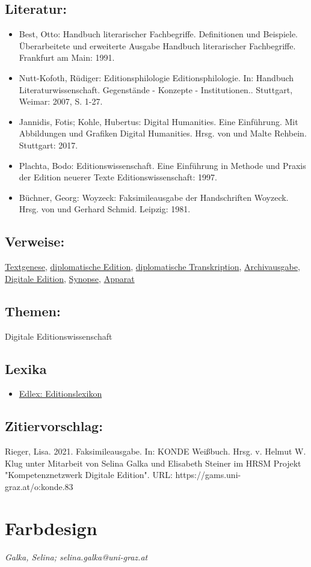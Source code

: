 \documentclass{article}
\begin{document}
        \subsection*{Literatur:}\begin{itemize}\item Best, Otto: Handbuch literarischer Fachbegriffe. Definitionen und
                              Beispiele. Überarbeitete und erweiterte Ausgabe Handbuch literarischer Fachbegriffe. Frankfurt am Main: 1991.\item Nutt-Kofoth, Rüdiger: Editionsphilologie Editionsphilologie. In: Handbuch Literaturwissenschaft. Gegenstände - Konzepte -
                              Institutionen.. Stuttgart, Weimar: 2007, S. 1-27.\item Jannidis, Fotis; Kohle, Hubertus: Digital Humanities. Eine Einführung. Mit Abbildungen und
                              Grafiken Digital Humanities. Hrsg. von  und Malte Rehbein. Stuttgart: 2017.\item Plachta, Bodo: Editionswissenschaft. Eine Einführung in Methode und
                              Praxis der Edition neuerer Texte Editionswissenschaft: 1997.\item Büchner, Georg: Woyzeck: Faksimileausgabe der Handschriften Woyzeck. Hrsg. von  und Gerhard Schmid. Leipzig: 1981.\end{itemize}\subsection*{Verweise:}\href{https://gams.uni-graz.at/o:konde.28}{Textgenese}, \href{https://gams.uni-graz.at/o:konde.65}{diplomatische Edition}, \href{https://gams.uni-graz.at/o:konde.66}{diplomatische Transkription}, \href{https://gams.uni-graz.at/o:konde.33}{Archivausgabe}, \href{https://gams.uni-graz.at/o:konde.59}{Digitale Edition}, \href{https://gams.uni-graz.at/o:konde.174}{Synopse}, \href{https://gams.uni-graz.at/o:konde.32}{Apparat}\subsection*{Themen:}Digitale Editionswissenschaft\subsection*{Lexika}\begin{itemize}\item \href{https://edlex.de/index.php?title=Faksimileausgabe}{Edlex: Editionslexikon}\end{itemize}\subsection*{Zitiervorschlag:}Rieger, Lisa. 2021. Faksimileausgabe. In: KONDE Weißbuch. Hrsg. v. Helmut W. Klug unter Mitarbeit von Selina Galka und Elisabeth Steiner im HRSM Projekt "Kompetenznetzwerk Digitale Edition". URL: https://gams.uni-graz.at/o:konde.83\newpage\section*{Farbdesign} \emph{Galka, Selina; selina.galka@uni-graz.at }\\
        
\end{document}
